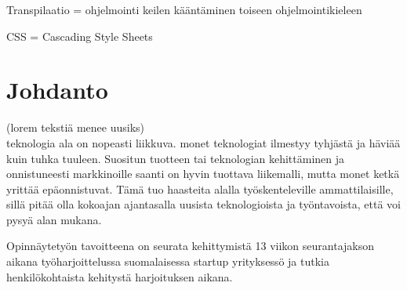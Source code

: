 \documentclass[11pt,a4paper,titlepage,oneside]{article}
\begin{document}
Transpilaatio = ohjelmointi keilen kääntäminen toiseen ohjelmointikieleen
\bigskip

CSS = Cascading Style Sheets
\bigskip



\newpage





\clearpage
\setcounter{page}{1}

\pagestyle{fancy}
\lfoot{}
\cfoot{}
\rfoot{}
\lhead{}
\chead{}
\rhead{\thepage}
\renewcommand{\headrulewidth}{0pt}
\renewcommand{\footrulewidth}{0pt}


\section{Johdanto}              %






(lorem tekstiä menee uusiks)\\
teknologia ala on nopeasti liikkuva. monet teknologiat ilmestyy tyhjästä ja häviää kuin tuhka tuuleen.
Suositun tuotteen tai teknologian kehittäminen ja onnistuneesti markkinoille saanti on hyvin tuottava liikemalli, 
mutta monet ketkä yrittää epäonnistuvat.
Tämä tuo haasteita alalla työskenteleville ammattilaisille, 
sillä pitää olla kokoajan ajantasalla uusista teknologioista ja työntavoista, että voi pysyä alan mukana.
\medskip


Opinnäytetyön tavoitteena on seurata kehittymistä 13 viikon seurantajakson aikana työharjoittelussa suomalaisessa startup yrityksessö
ja tutkia henkilökohtaista kehitystä harjoituksen aikana.
\medskip
\end{document}
